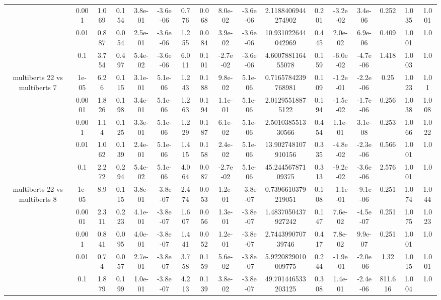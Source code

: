 \begin{tabular}{|c|c|c|c|c|c|c|c|c|c|c|c|c|c|c|c|c|}
 & 0.001 & 1.069 & 0.154 & 3.8e-01 & -3.6e-06 & 0.776 & 0.068 & 8.0e-02 & -3.6e-06 & 2.1188406944274902 & 0.201 & -3.2e-02 & 3.4e-06 & 0.252 & 1.035 & 1.001 \\
 & 0.01 & 0.887 & 0.054 & 2.5e-01 & -3.6e-06 & 1.255 & 0.084 & 3.9e-02 & -3.6e-06 & 10.931022644042969 & 0.445 & 2.0e-02 & 6.9e-06 & 0.409 & 1.001 & 1.0 \\
 & 0.1 & 3.754 & 0.497 & 5.4e-02 & -3.6e-06 & 6.011 & 0.101 & -2.7e-02 & -3.6e-06 & 4.600788116455078 & 0.159 & -6.0e-02 & -4.7e-06 & 1.418 & 1.003 & 1.0 \\
\hline
\multirow{5}{*}{multiberts 22 vs multiberts 7} & 1e-05 & 6.26 & 0.115 & 3.1e-01 & 5.1e-06 & 1.243 & 0.188 & 9.8e-02 & 5.1e-06 & 0.7165784239768981 & 0.109 & -1.2e-01 & -2.2e-06 & 0.25 & 1.023 & 1.01 \\
 & 0.0001 & 1.826 & 0.198 & 3.4e-01 & 5.1e-06 & 1.263 & 0.194 & 1.1e-01 & 5.1e-06 & 2.01295518875122 & 0.194 & -1.5e-02 & -1.7e-06 & 0.256 & 1.038 & 1.008 \\
 & 0.001 & 1.14 & 0.125 & 3.3e-01 & 5.1e-06 & 1.229 & 0.187 & 6.1e-02 & 5.1e-06 & 2.501038551330566 & 0.454 & 1.1e-01 & 3.1e-08 & 0.253 & 1.066 & 1.022 \\
 & 0.01 & 1.062 & 0.139 & 2.4e-01 & 5.1e-06 & 1.415 & 0.158 & 2.4e-02 & 5.1e-06 & 13.902748107910156 & 0.335 & -4.8e-02 & -2.3e-06 & 0.566 & 1.001 & 1.0 \\
 & 0.1 & 2.272 & 0.294 & 5.4e-02 & 5.1e-06 & 4.064 & 0.087 & -2.7e-02 & 5.1e-06 & 45.24456787109375 & 0.313 & -9.2e-02 & -3.6e-06 & 2.576 & 1.001 & 1.0 \\
\hline
\multirow{5}{*}{multiberts 22 vs multiberts 8} & 1e-05 & 8.9 & 0.115 & 3.8e-01 & -3.8e-07 & 2.474 & 0.053 & 1.2e-01 & -3.8e-07 & 0.7396610379219051 & 0.108 & -1.1e-01 & -9.1e-06 & 0.251 & 1.074 & 1.044 \\
 & 0.0001 & 2.311 & 0.223 & 4.1e-01 & -3.8e-07 & 1.607 & 0.056 & 1.3e-01 & -3.8e-07 & 1.4837050437927242 & 0.147 & 7.6e-02 & -4.5e-07 & 0.251 & 1.075 & 1.023 \\
 & 0.001 & 0.841 & 0.095 & 4.0e-01 & -3.8e-07 & 1.441 & 0.052 & 1.2e-01 & -3.8e-07 & 2.744399070739746 & 0.417 & 7.8e-02 & 9.9e-07 & 0.251 & 1.001 & 1.0 \\
 & 0.01 & 0.74 & 0.057 & 2.7e-01 & -3.8e-07 & 3.758 & 0.159 & 5.6e-02 & -3.8e-07 & 5.9220829010009775 & 0.244 & -1.9e-01 & -2.0e-06 & 1.32 & 1.015 & 1.001 \\
 & 0.1 & 1.879 & 0.199 & 1.0e-01 & -3.8e-07 & 4.213 & 0.139 & 3.8e-02 & -3.8e-07 & 49.701446533203125 & 0.308 & 1.4e-01 & -2.4e-06 & 811.616 & 1.004 & 1.0 \\

\end{tabular}
